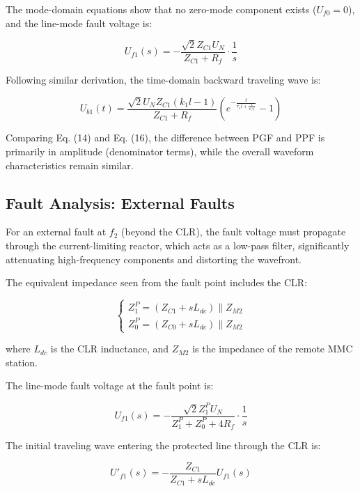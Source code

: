 \documentclass[journal]{IEEEtran}
\begin{document}
The mode-domain equations show that no zero-mode component exists ($U_{f0} = 0$), and the line-mode fault voltage is:

\begin{equation}
U_{f1}(s) = -\frac{\sqrt{2}Z_{C1}U_N}{Z_{C1} + R_f} \cdot \frac{1}{s}
\end{equation}

Following similar derivation, the time-domain backward traveling wave is:

\begin{equation}
U_{b1}(t) = \frac{\sqrt{2}U_NZ_{C1}(k_1l - 1)}{Z_{C1} + R_f} \left(e^{-\frac{t}{\tau_1 l + \frac{1}{v_1\tau_1}}} - 1\right)
\end{equation}

Comparing Eq. (14) and Eq. (16), the difference between PGF and PPF is primarily in amplitude (denominator terms), while the overall waveform characteristics remain similar.

\subsection{Fault Analysis: External Faults}

For an external fault at $f_2$ (beyond the CLR), the fault voltage must propagate through the current-limiting reactor, which acts as a low-pass filter, significantly attenuating high-frequency components and distorting the wavefront.

The equivalent impedance seen from the fault point includes the CLR:

\begin{equation}
\begin{cases}
Z^P_1 = (Z_{C1} + sL_{dc}) \parallel Z_{M2} \\
Z^P_0 = (Z_{C0} + sL_{dc}) \parallel Z_{M2}
\end{cases}
\end{equation}

where $L_{dc}$ is the CLR inductance, and $Z_{M2}$ is the impedance of the remote MMC station.

The line-mode fault voltage at the fault point is:

\begin{equation}
U_{f1}(s) = -\frac{\sqrt{2}Z^P_1 U_N}{Z^P_1 + Z^P_0 + 4R_f} \cdot \frac{1}{s}
\end{equation}

The initial traveling wave entering the protected line through the CLR is:

\begin{equation}
U'_{f1}(s) = -\frac{Z_{C1}}{Z_{C1} + sL_{dc}} U_{f1}(s)
\end{equation}
\end{document}

